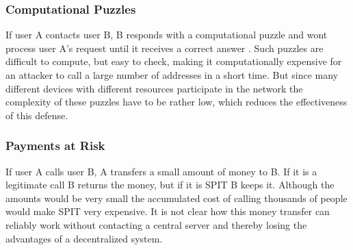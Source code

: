 \documentclass[a4paper,10pt]{article}
\begin{document}
\subsubsection{Computational Puzzles}
If user A contacts user B, B responds with a computational puzzle and wont
process user A's request until it receives a correct answer \cite{touceda}. Such
puzzles
are difficult to compute, but easy to check, making it computationally expensive
for an attacker to call a large number of addresses in a short time.
But since many different devices with different resources participate in the
network the complexity of these puzzles have to be rather low, which
reduces the effectiveness of this defense.

\subsubsection{Payments at Risk}
If user A calls user B, A transfers a small amount of money to B. If it is a
legitimate call B returns the money, but if it is SPIT B keeps it. Although
the amounts would be very small the accumulated cost of calling thousands of
people would make SPIT very expensive. It is not clear how this money transfer
can reliably work without contacting a central server and thereby losing the
advantages of a decentralized system.



\end{document}
